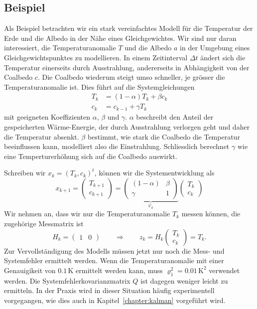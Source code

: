 \subsection{Beispiel}
Als Beispiel betrachten wir ein stark vereinfachtes Modell für die
Temperatur der Erde und die Albedo in der Nähe eines Gleichgewichtes.
Wir sind nur daran interessiert, die Temperaturanomalie $T$ und die
Albedo $a$ in der Umgebung eines Gleichgewichtspunktes zu
modellieren.
In einem Zeitinterval $\Delta t$ ändert sich die Temperatur
einerseits durch Ausstrahlung, andererseits in Abhängigkeit von
der Coalbedo $c$. 
Die Coalbedo wiederum steigt umso schneller, je grösser die
Temperaturanomalie ist.
Dies führt auf die Systemgleichungen
\[
\begin{aligned}
T_k &= (1-\alpha) T_k  + \beta c_k \\
c_k &= c_{k-1} + \gamma T_k
\end{aligned}
\]
mit geeigneten Koeffizienten $\alpha$, $\beta$ und $\gamma$.
$\alpha$ beschreibt den Anteil der gespeicherten Wärme-Energie, der durch
Ausstrahlung verlorgen geht und daher die Temperatur absenkt.
$\beta$ bestimmt, wie stark die Coalbedo die Temperatur beeinflussen kann,
modelliert also die Einstrahlung.
Schliesslich berechnet $\gamma$ wie eine Temperturerhöhung sich auf die
Coalbedo auswirkt.

Schreiben wir $x_k=(T_k,c_k)^t$, können wir die Systementwicklung als
\[
x_{k+1}
=
\begin{pmatrix}
T_{k+1}\\c_{k+1}
\end{pmatrix}
=
\underbrace{
\begin{pmatrix}
(1-\alpha)&\beta\\
\gamma& 1
\end{pmatrix}}_{\displaystyle\varphi_k}
\begin{pmatrix}
T_k\\c_k
\end{pmatrix}
\]
Wir nehmen an, dass wir nur die Temperaturanomalie $T_k$ messen können,
die zugehörige Messmatrix ist
\[
H_k=\begin{pmatrix}1&0\end{pmatrix}
\qquad\Rightarrow\qquad
z_k = H_k\begin{pmatrix} T_k\\c_k\end{pmatrix}
=
T_k.
\]
Zur Vervollständigung des Modells müssen jetzt nur noch die Mess- und
Systemfehler ermittelt werden.
Wenn die Temperaturanomalie mit einer Genauigikeit von $0.1\,\text{K}$
ermittelt werden kann, muss $\varrho_1^2=0.01\,\text{K}^2$ verwendet
werden.
Die Systemfehlerkovarianzmatrix $Q$ ist dagegen weniger leicht zu ermitteln.
In der Praxis wird in dieser Situation häufig experimentell vorgegangen,
wie dies auch in Kapitel~\ref{chapter:kalman} vorgeführt wird.






